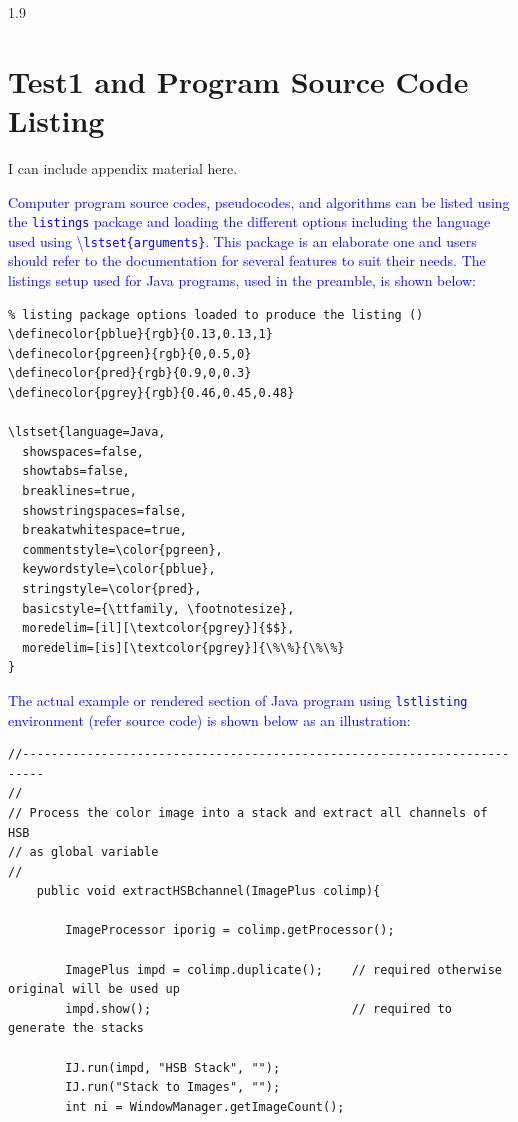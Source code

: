 \documentclass[phd]{ndsu-thesis-2022}
\newcommand\myspacing{1.9} %
\newcommand\italk[1]{\textcolor{blue}{#1}}  %
\newcommand\cmd[1]{\textbackslash\texttt{#1}}  %
\newcommand\vb[1]{\textcolor{blue}{\texttt{#1}}}%
\begin{document}
\begin{spacing}{\myspacing}
\kant[3]

\section{Test1 and Program Source Code Listing}
I can include appendix material here. \kant[9] 

\italk{Computer program source codes, pseudocodes, and algorithms can be listed using the \vb{listings} package and loading the different options including the language used using \cmd{lstset\{arguments\}}. This package is an elaborate one and users should refer to the documentation for several features to suit their needs. The listings setup used for Java programs, used in the preamble, is shown below:}

{\small
\singlespacing
\begin{verbatim}
% listing package options loaded to produce the listing ()
\definecolor{pblue}{rgb}{0.13,0.13,1}
\definecolor{pgreen}{rgb}{0,0.5,0}
\definecolor{pred}{rgb}{0.9,0,0.3}
\definecolor{pgrey}{rgb}{0.46,0.45,0.48}

\lstset{language=Java, 
  showspaces=false,
  showtabs=false,
  breaklines=true,
  showstringspaces=false,
  breakatwhitespace=true,
  commentstyle=\color{pgreen},
  keywordstyle=\color{pblue},
  stringstyle=\color{pred},
  basicstyle={\ttfamily, \footnotesize},
  moredelim=[il][\textcolor{pgrey}]{$$},
  moredelim=[is][\textcolor{pgrey}]{\%\%}{\%\%}
}
\end{verbatim}
}

\italk{The actual example or rendered section of Java program using \vb{lstlisting} environment (refer source code) is shown below as an illustration:}

{\singlespacing
\begin{lstlisting}
//-------------------------------------------------------------------------
//
// Process the color image into a stack and extract all channels of HSB 
// as global variable
//
	public void extractHSBchannel(ImagePlus colimp){

		ImageProcessor iporig = colimp.getProcessor();
		
		ImagePlus impd = colimp.duplicate();	// required otherwise original will be used up
		impd.show();						    // required to generate the stacks
		
		IJ.run(impd, "HSB Stack", "");
		IJ.run("Stack to Images", "");
		int ni = WindowManager.getImageCount();


\end{lstlisting}}
\end{spacing}
\end{document}
